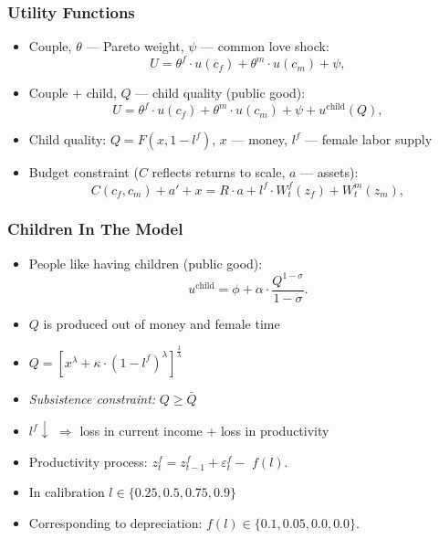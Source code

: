 \documentclass{beamer}
\begin{document}
\begin{frame}[label=utilities]
\frametitle{Utility Functions}
\begin{itemize}
\item Couple, $\theta$ --- Pareto weight, $\psi$ --- common love shock:
\[U = \theta^f \cdot u(c_f) + \theta^m \cdot u(c_m) + \psi,\]
\item Couple + child, $Q$ --- child quality (public good):
\[U = \theta^f \cdot {u}(c_f) + \theta^m \cdot {u}(c_m) + \psi + u^{\text{child}}(Q),\]
\item Child quality: $Q = F(x,1-l^f)$, $x$ --- money, $l^f$ --- female labor supply
\item Budget constraint ($C$ reflects returns to scale, $a$ --- assets):
 \[C(c_f,c_m) + a' + x = R\cdot a + l^f \cdot W^f_t(z_f) + W^m_t(z_m),\]
\end{itemize}
\hyperlink{value-functions}{}
\end{frame}


\begin{frame}
\frametitle{Children In The Model}
\begin{itemize}
\item People like having children (public good):
\[u^{\text{child}} = \phi + \alpha \cdot \frac{Q^{1-\sigma}}{1-\sigma}.\]
\item $Q$ is produced out of money and female time
\item $Q = \left[ x^{\lambda} + \kappa \cdot (1-l^f)^{\lambda}\right]^{\frac1\lambda}$
\item \textit{Subsistence constraint:} $Q \geq \bar{Q}$
\item $l^f\downarrow$ $\Rightarrow$ loss in current income + loss in productivity
\item Productivity process: $z^f_t = z^f_{t-1} + \varepsilon^f_{t}  - $ {\boldmath $f(l)$}.
\item In calibration $l \in \{0.25,0.5,0.75,0.9\}$
\item Corresponding to depreciation: $f(l) \in \{0.1,0.05,0.0,0.0\}$.
\end{itemize}
\end{frame}
\end{document}
